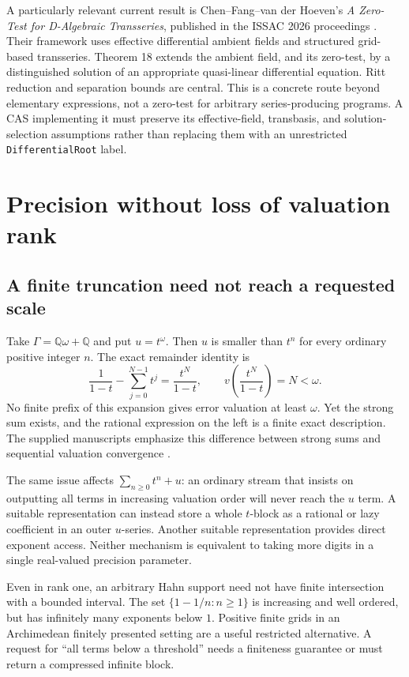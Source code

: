 \documentclass[11pt,letterpaper]{article}
\theoremstyle{definition}\newtheorem{definition}[theorem]{Definition}
\theoremstyle{remark}\newtheorem{remark}[theorem]{Remark}
\newcommand{\Q}{\mathbb Q}\newcommand{\N}{\mathbb N}\newcommand{\Z}{\mathbb Z}
\newcommand{\code}[1]{\texttt{#1}}
\numberwithin{equation}{section}\setcounter{tocdepth}{2}
\begin{document}
A particularly relevant current result is Chen--Fang--van der Hoeven's \emph{A Zero-Test for D-Algebraic Transseries}, published in the ISSAC 2026 proceedings \cite{CFH}. Their framework uses effective differential ambient fields and structured grid-based transseries. Theorem 18 extends the ambient field, and its zero-test, by a distinguished solution of an appropriate quasi-linear differential equation. Ritt reduction and separation bounds are central. This is a concrete route beyond elementary expressions, not a zero-test for arbitrary series-producing programs. A CAS implementing it must preserve its effective-field, transbasis, and solution-selection assumptions rather than replacing them with an unrestricted \code{DifferentialRoot} label.

\section{Precision without loss of valuation rank}\label{sec:precision}
\subsection{A finite truncation need not reach a requested scale}
Take $\Gamma=\Q\omega+\Q$ and put $u=t^\omega$. Then $u$ is smaller than $t^n$ for every ordinary positive integer $n$. The exact remainder identity is
\begin{equation}\label{eq:geometricremainder}
 \frac1{1-t}-\sum_{j=0}^{N-1}t^j=\frac{t^N}{1-t},
 \qquad v\left(\frac{t^N}{1-t}\right)=N<\omega.
\end{equation}
No finite prefix of this expansion gives error valuation at least $\omega$. Yet the strong sum exists, and the rational expression on the left is a finite exact description. The supplied manuscripts emphasize this difference between strong sums and sequential valuation convergence \cite{AG,CT}.

The same issue affects $\sum_{n\ge0}t^n+u$: an ordinary stream that insists on outputting all terms in increasing valuation order will never reach the $u$ term. A suitable representation can instead store a whole $t$-block as a rational or lazy coefficient in an outer $u$-series. Another suitable representation provides direct exponent access. Neither mechanism is equivalent to taking more digits in a single real-valued precision parameter.

Even in rank one, an arbitrary Hahn support need not have finite intersection with a bounded interval. The set $\{1-1/n:n\ge1\}$ is increasing and well ordered, but has infinitely many exponents below $1$. Positive finite grids in an Archimedean finitely presented setting are a useful restricted alternative. A request for ``all terms below a threshold'' needs a finiteness guarantee or must return a compressed infinite block.
\end{document}
